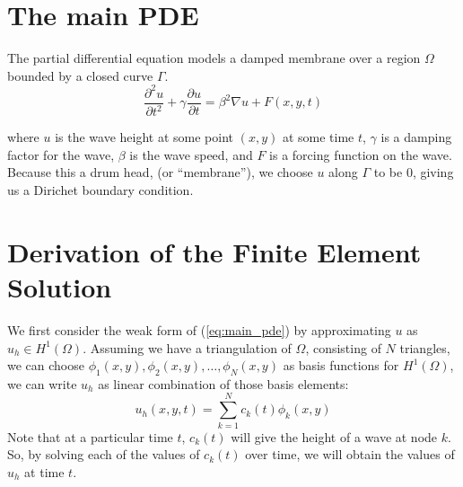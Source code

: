 \documentclass[a4paper,12pt]{article}
\begin{document}
\section{The main PDE}
The partial differential equation models a damped membrane over a region $\Omega$ bounded by a closed curve $\Gamma$.
\begin{equation} \label{eq:main_pde}
\frac{\partial^2u}{\partial t^2} + \gamma \frac{\partial u}{\partial t}
=
\beta^2 \nabla u + F(x,y,t)
\end{equation}

where $u$ is the wave height at some point $(x,y)$ at some time $t$, $\gamma$ is a damping factor for the wave,
$\beta$ is the wave speed, and $F$ is a forcing function on the wave. Because this a drum head, (or ``membrane''), we choose
$u$ along $\Gamma$ to be 0, giving us a Dirichet boundary condition.

\section{Derivation of the Finite Element Solution}
We first consider the weak form of (\ref{eq:main_pde}) by approximating $u$ as $u_h \in H^1(\Omega)$. Assuming we have
a triangulation of $\Omega$, consisting of $N$ triangles, we can choose 
$\phi_1(x,y), \phi_2(x,y), \ldots, \phi_N(x,y)$ as basis functions for $H^1(\Omega)$, we can write $u_h$ as linear
combination of those basis elements:
\begin{equation} \label{eq:u_h}
u_h(x,y,t) = \sum\limits_{k=1}^N c_k(t) \phi_k(x,y)
\end{equation}
Note that at a particular time $t$, $c_k(t)$ will give the height of a wave at node $k$. So, by solving each of the values
of $c_k(t)$ over time, we will obtain the values of $u_h$ at time $t$.
\end{document}
